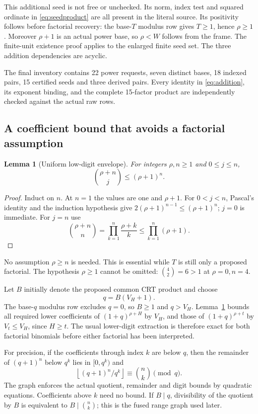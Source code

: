 \documentclass[11pt]{article}
\newtheorem{lemma}[theorem]{Lemma}
\theoremstyle{definition}\newtheorem{definition}[theorem]{Definition}
\newcommand{\floor}[1]{\left\lfloor#1\right\rfloor}
\begin{document}
This additional seed is not free or unchecked. Its norm, index test and
squared ordinate in \eqref{eq:seedproduct} are all present in the
literal source. Its positivity follows before factorial recovery:
the base-$T$ modulus row gives $T\ge1$, hence $\rho\ge1$. Moreover
$\rho+1$ is an actual power base, so $\rho<W$ follows from the frame.
The finite-unit existence proof applies to the enlarged finite seed set.
The three addition dependencies are acyclic.

The final inventory contains 22 power requests, seven distinct bases,
18 indexed pairs, 15 certified seeds and three derived pairs. Every
identity in \eqref{eq:addition}, its exponent binding, and the complete
15-factor product are independently checked against the actual raw rows.

\subsection{A coefficient bound that avoids a factorial assumption}
\begin{lemma}[Uniform low-digit envelope]\label{lem:binomial}
For integers $\rho,n\ge1$ and $0\le j\le n$,
\[
 \binom{\rho+n}{j}\le(\rho+1)^n.
\]
\end{lemma}
\begin{proof}
Induct on $n$. At $n=1$ the values are one and $\rho+1$.
For $0<j<n$, Pascal's identity and the induction hypothesis give
$2(\rho+1)^{n-1}\le(\rho+1)^n$; $j=0$ is immediate. For $j=n$ use
\[
 \binom{\rho+n}{n}=\prod_{k=1}^n\frac{\rho+k}{k}
 \le\prod_{k=1}^n(\rho+1).
\]
\end{proof}
No assumption $\rho\ge n$ is needed. This is essential while $T$ is
still only a proposed factorial. The hypothesis $\rho\ge1$ cannot be
omitted: $\binom42=6>1$ at $\rho=0,n=4$.

Let $B$ initially denote the proposed common CRT product and choose
\begin{equation}\label{eq:radix}
 q=B(V_H+1).
\end{equation}
The base-$q$ modulus row excludes $q=0$, so $B\ge1$ and $q>V_H$.
Lemma~\ref{lem:binomial} bounds all required lower coefficients of
$(1+q)^{\rho+H}$ by $V_H$, and those of $(1+q)^{\rho+t}$ by
$V_t\le V_H$, since $H\ge t$. The usual lower-digit extraction is
therefore exact for both factorial binomials before either factorial
has been interpreted.

For precision, if the coefficients through index $k$ are below $q$, then
the remainder of $(q+1)^n$ below $q^k$ lies in $[0,q^k)$ and
\[
 \floor{(q+1)^n/q^k}\equiv\binom nk\pmod q.
\]
The graph enforces the actual quotient, remainder and digit bounds by
quadratic equations. Coefficients above $k$ need no bound. If $B\mid q$,
divisibility of the quotient by $B$ is equivalent to
$B\mid\binom nk$; this is the fused range graph used later.
\end{document}
